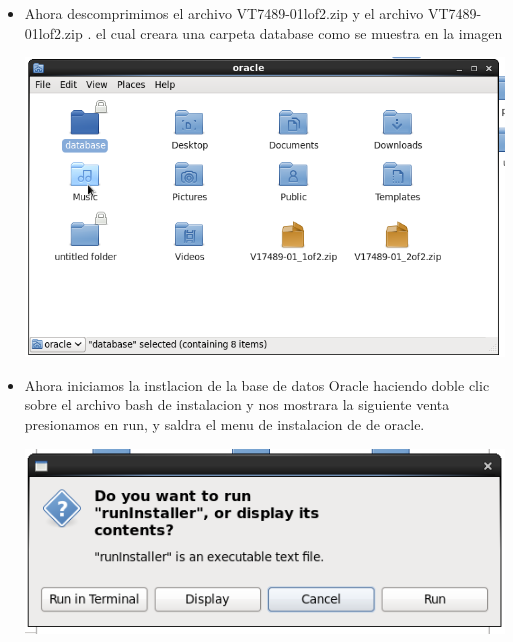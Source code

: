 \begin{itemize}
	\item Ahora descomprimimos el archivo VT7489-01lof2.zip y el archivo VT7489-01lof2.zip . el cual creara una carpeta database como se muestra en la imagen
	\begin{center}
	\includegraphics[width=14cm]{./Imagenes/img45} 
	\end{center}
\newpage
	\item Ahora iniciamos la instlacion de la base de datos Oracle haciendo doble clic sobre el archivo bash de instalacion y nos mostrara la siguiente venta presionamos en run, y saldra el menu de instalacion de de oracle.
	\begin{center}
	\includegraphics[width=14cm]{./Imagenes/img47} 
	\end{center}
	

\end{itemize}
